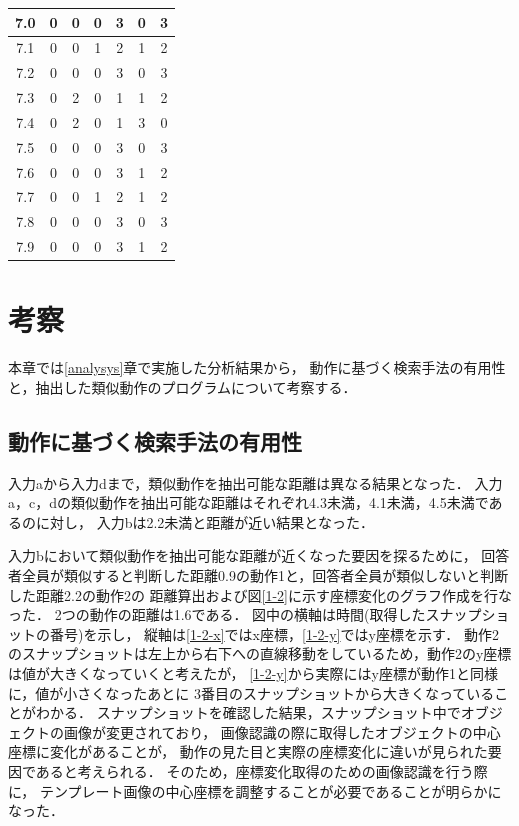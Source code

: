 \documentclass[11pt]{jreport}
\begin{document}
\begin{table}
{\begin{tabular}{c|c|c|c|c|c|c}
    \hline
    7.0 & 0 & 0 & 0 & 3 & 0 & 3 \\
    \hline
    7.1 & 0 & 0 & 1 & 2 & 1 & 2 \\
    \hline
    7.2 & 0 & 0 & 0 & 3 & 0 & 3 \\
    \hline
    7.3 & 0 & 2 & 0 & 1 & 1 & 2 \\
    \hline
    7.4 & 0 & 2 & 0 & 1 & 3 & 0 \\
    \hline
    7.5 & 0 & 0 & 0 & 3 & 0 & 3 \\
    \hline
    7.6 & 0 & 0 & 0 & 3 & 1 & 2 \\
    \hline
    7.7 & 0 & 0 & 1 & 2 & 1 & 2 \\
    \hline
    7.8 & 0 & 0 & 0 & 3 & 0 & 3 \\
    \hline
    7.9 & 0 & 0 & 0 & 3 & 1 & 2 \\
    \hline
    \end{tabular}
    }
\end{table}       


\chapter{考察}
本章では\ref{analysys}章で実施した分析結果から，
動作に基づく検索手法の有用性と，抽出した類似動作のプログラムについて考察する．

\section{動作に基づく検索手法の有用性}

入力aから入力dまで，類似動作を抽出可能な距離は異なる結果となった．
入力a，c，dの類似動作を抽出可能な距離はそれぞれ4.3未満，4.1未満，4.5未満であるのに対し，
入力bは2.2未満と距離が近い結果となった．

入力bにおいて類似動作を抽出可能な距離が近くなった要因を探るために，
回答者全員が類似すると判断した距離0.9の動作1と，回答者全員が類似しないと判断した距離2.2の動作2の
距離算出および図\ref{1-2}に示す座標変化のグラフ作成を行なった．
2つの動作の距離は1.6である．
図中の横軸は時間(取得したスナップショットの番号)を示し，
縦軸は\ref{1-2-x}ではx座標，\ref{1-2-y}ではy座標を示す．
動作2のスナップショットは左上から右下への直線移動をしているため，動作2のy座標は値が大きくなっていくと考えたが，
\ref{1-2-y}から実際にはy座標が動作1と同様に，値が小さくなったあとに
3番目のスナップショットから大きくなっていることがわかる．
スナップショットを確認した結果，スナップショット中でオブジェクトの画像が変更されており，
画像認識の際に取得したオブジェクトの中心座標に変化があることが，
動作の見た目と実際の座標変化に違いが見られた要因であると考えられる．
そのため，座標変化取得のための画像認識を行う際に，
テンプレート画像の中心座標を調整することが必要であることが明らかになった．
\end{document}
